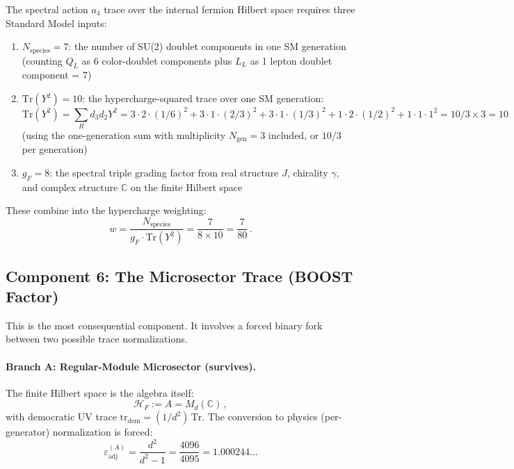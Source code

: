 \documentclass[12pt,a4paper]{article}
\begin{document}
The spectral action $a_4$ trace over the internal fermion Hilbert
space requires three Standard Model inputs:

\begin{enumerate}
\item $N_{\mathrm{species}} = 7$: the number of SU(2) doublet
  components in one SM generation (counting $Q_L$ as 6 color-doublet
  components plus $L_L$ as 1 lepton doublet component = 7)

\item $\mathrm{Tr}(Y^2) = 10$: the hypercharge-squared trace over
  one SM generation:
  \[
  \mathrm{Tr}(Y^2) = \sum_R d_3 d_2 Y^2
  = 3 \cdot 2 \cdot (1/6)^2 + 3 \cdot 1 \cdot (2/3)^2
  + 3 \cdot 1 \cdot (1/3)^2 + 1 \cdot 2 \cdot (1/2)^2
  + 1 \cdot 1 \cdot 1^2 = 10/3 \times 3 = 10
  \]
  (using the one-generation sum with multiplicity $N_{\mathrm{gen}} = 3$
  included, or $10/3$ per generation)

\item $g_F = 8$: the spectral triple grading factor from real
  structure $J$, chirality $\gamma$, and complex structure
  $\mathbb{C}$ on the finite Hilbert space
\end{enumerate}

These combine into the hypercharge weighting:
\begin{equation}
w = \frac{N_{\mathrm{species}}}{g_F \cdot \mathrm{Tr}(Y^2)}
= \frac{7}{8 \times 10} = \frac{7}{80}\,.
\end{equation}

\subsection{Component 6: The Microsector Trace (BOOST Factor)}
\label{sec:boost}

This is the most consequential component. It involves a forced binary
fork between two possible trace normalizations.

\paragraph{Branch A: Regular-Module Microsector (survives).}
The finite Hilbert space is the algebra itself:
\begin{equation}
\mathcal{H}_F := A = M_d(\mathbb{C})\,,
\end{equation}
with democratic UV trace $\mathrm{tr}_{\mathrm{dem}} = (1/d^2)\,\mathrm{Tr}$.
The conversion to physics (per-generator) normalization is forced:
\begin{equation}
\varepsilon_{\mathrm{adj}}^{(A)} = \frac{d^2}{d^2 - 1}
= \frac{4096}{4095} = 1.000244\ldots
\end{equation}
\end{document}
